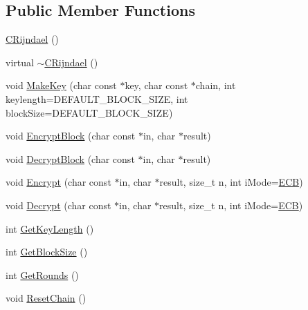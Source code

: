 \subsection*{Public Member Functions}
\begin{DoxyCompactItemize}
\item 
\hyperlink{classCRijndael_ac8d9fa05974a5db55a2d358d3a9053d9}{C\-Rijndael} ()
\item 
virtual \hyperlink{classCRijndael_a5546851f5b559f4e6390ded7d0275fe2}{$\sim$\-C\-Rijndael} ()
\item 
void \hyperlink{classCRijndael_a6bb75a9fa43efda9d1de93af7f2fa33f}{Make\-Key} (char const $\ast$key, char const $\ast$chain, int keylength=D\-E\-F\-A\-U\-L\-T\-\_\-\-B\-L\-O\-C\-K\-\_\-\-S\-I\-Z\-E, int block\-Size=D\-E\-F\-A\-U\-L\-T\-\_\-\-B\-L\-O\-C\-K\-\_\-\-S\-I\-Z\-E)
\item 
void \hyperlink{classCRijndael_a09387f9fe5f14a9215e124971024d74a}{Encrypt\-Block} (char const $\ast$in, char $\ast$result)
\item 
void \hyperlink{classCRijndael_aa7f895798f3da4ce102ba0c85e417ed0}{Decrypt\-Block} (char const $\ast$in, char $\ast$result)
\item 
void \hyperlink{classCRijndael_a2eed7961ae006ecbbe7d4db81139d2c0}{Encrypt} (char const $\ast$in, char $\ast$result, size\-\_\-t n, int i\-Mode=\hyperlink{classCRijndael_ac1444c814f491f48deb465ef667581d2a45277dc10dfb5fb3b29dd622f2fa95e1}{E\-C\-B})
\item 
void \hyperlink{classCRijndael_ab897e845d52d1b7a9d9f918300181383}{Decrypt} (char const $\ast$in, char $\ast$result, size\-\_\-t n, int i\-Mode=\hyperlink{classCRijndael_ac1444c814f491f48deb465ef667581d2a45277dc10dfb5fb3b29dd622f2fa95e1}{E\-C\-B})
\item 
int \hyperlink{classCRijndael_a7bd67837a28c50ff22b67a1c63856650}{Get\-Key\-Length} ()
\item 
int \hyperlink{classCRijndael_ab4f96cd740474df6929bdd515abe7395}{Get\-Block\-Size} ()
\item 
int \hyperlink{classCRijndael_a16e1f262a77e108dc3dbc67bf52041b7}{Get\-Rounds} ()
\item 
void \hyperlink{classCRijndael_a8f67681d34a25ba8a920353592ab4b1e}{Reset\-Chain} ()
\end{DoxyCompactItemize}
